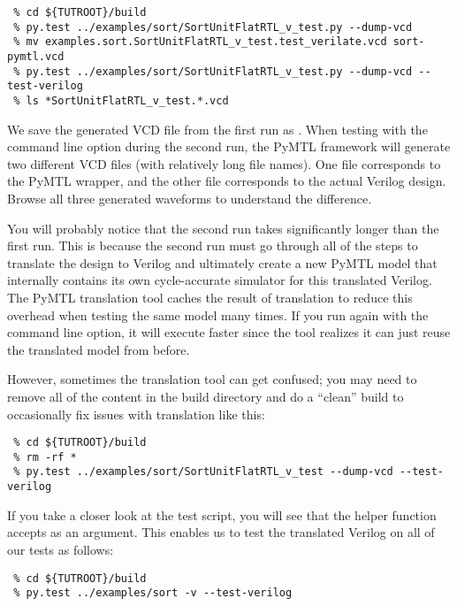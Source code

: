\documentclass{cbxdoc}
\begin{document}
\begin{verbatim}
 % cd ${TUTROOT}/build
 % py.test ../examples/sort/SortUnitFlatRTL_v_test.py --dump-vcd
 % mv examples.sort.SortUnitFlatRTL_v_test.test_verilate.vcd sort-pymtl.vcd
 % py.test ../examples/sort/SortUnitFlatRTL_v_test.py --dump-vcd --test-verilog
 % ls *SortUnitFlatRTL_v_test.*.vcd
\end{verbatim}

We save the generated VCD file from the first  run as
. When testing with the  command
line option during the second  run, the PyMTL framework will
generate two different VCD files (with relatively long file names). One
file corresponds to the PyMTL wrapper, and the other file corresponds to
the actual Verilog design. Browse all three generated waveforms to
understand the difference.

You will probably notice that the second  run takes
significantly longer than the first  run. This is because the
second  run must go through all of the steps to translate the
design to Verilog and ultimately create a new PyMTL model that internally
contains its own cycle-accurate simulator for this translated Verilog.
The PyMTL translation tool caches the result of translation to reduce
this overhead when testing the same model many times. If you run
 again with the  command line option, it
will execute faster since the tool realizes it can just reuse the
translated model from before.

\newpage

However, sometimes the translation tool can get confused; you may need to
remove all of the content in the build directory and do a ``clean'' build
to occasionally fix issues with translation like this:

\begin{verbatim}
 % cd ${TUTROOT}/build
 % rm -rf *
 % py.test ../examples/sort/SortUnitFlatRTL_v_test --dump-vcd --test-verilog
\end{verbatim}

If you take a closer look at the  test
script, you will see that the  helper function accepts
 as an argument. This enables us to test the translated
Verilog on all of our tests as follows:

\begin{verbatim}
 % cd ${TUTROOT}/build
 % py.test ../examples/sort -v --test-verilog
\end{verbatim}
\end{document}

